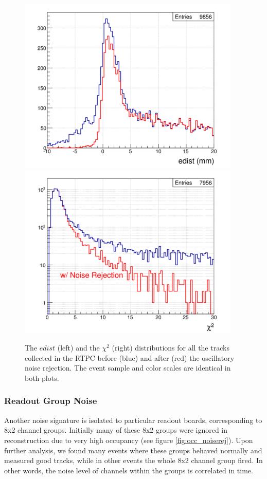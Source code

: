 \begin{figure}[tbp]
\includegraphics[scale=0.55]{fig_rtpc/400px-Edist_noiserej.png}
\includegraphics[scale=0.55]{fig_rtpc/400px-X2_noiserej.png}
\caption{The $edist$ (left) and the $\chi^{2}$ (right) distributions for all 
the tracks collected in the RTPC before (blue) and after (red) the oscillatory 
noise rejection. The event sample and color scales are identical in both 
plots.}
\label{fig:noise_edist_}
\end{figure}

\subsubsection{Readout Group Noise}
Another noise signature is isolated to particular readout boards, corresponding 
to 8x2 channel groups. Initially many of these 8x2 groups were ignored in 
reconstruction due to very high occupancy (see figure \ref{fig:occ_noiserej}).  
Upon further analysis, we found many events where these groups behaved normally 
and measured good tracks, while in other events the whole 8x2 channel group 
fired. In other words, the noise level of channels within the groups is 
correlated in time.

